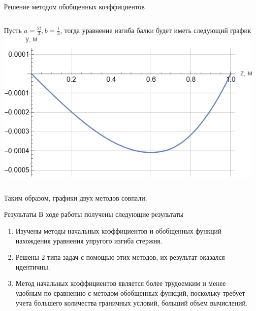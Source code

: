 \documentclass[ignoreonframetext,unicode]{beamer}
\begin{document}
\begin{frame}{Решение методом обобщенных коэффициентов}
	\begin{columns}
		Пусть $a = \frac{2 l}{3}, b = \frac{l}{3}$, тогда уравнение изгиба балки будет иметь следующий график
		\includegraphics[width=\textwidth]{g.4}
	\end{columns}
\begin{center}
{Таким образом, графики двух методов совпали.}
\end{center}
\end{frame}

\begin{frame}{Результаты}
	В ходе работы получены следующие результаты
	\begin{block}{}
	\begin{enumerate}
		\item Изучены методы начальных коэффициентов и обобщенных функций нахождения уравнения упругого изгиба стержня.	
		\item Решены 2 типа задач с помощью этих методов, их результат оказался идентичны.
		\item Метод начальных коэффициентов является более трудоемким и менее удобным по сравнению с методом обобщенных функций, поскольку требует учета большего количества граничных условий, больший объем вычислений.
	\end{enumerate}
	\end{block}	
\end{frame}	
\end{document}
